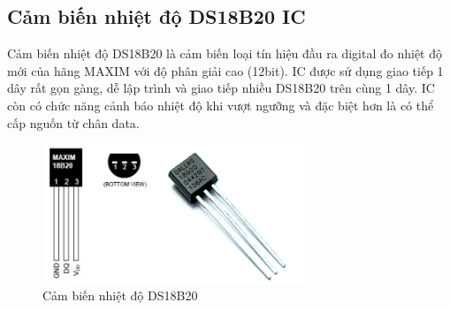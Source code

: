 \subsection*{Cảm biến nhiệt độ DS18B20 IC} 
Cảm biến nhiệt độ DS18B20 là cảm biến loại tín hiệu đầu ra digital đo nhiệt độ mới của hãng MAXIM với độ phân giải cao (12bit). IC được sử dụng giao tiếp 1 dây rất gọn gàng, dễ lập trình và giao tiếp nhiều DS18B20 trên cùng 1 dây. IC còn có chức năng cảnh báo nhiệt độ khi vượt ngưỡng và đặc biệt hơn là có thể cấp nguốn từ chân data.

\begin{figure}[H]
	\centering    
	\includegraphics[width=0.7\textwidth]{ds18b20}
	\caption[Cảm biến nhiệt độ DS18B20]{Cảm biến nhiệt độ DS18B20}
	\label{fig:ds18b20}
\end{figure}

